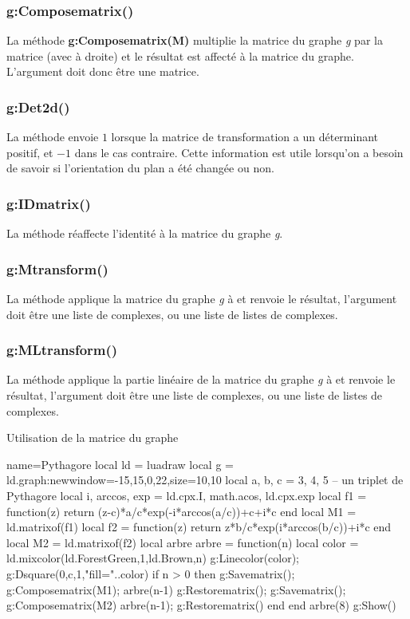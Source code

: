 \subsubsection{g:Composematrix()}
La méthode \textbf{g:Composematrix(M)} multiplie la matrice du graphe \emph{g} par la matrice  (avec  à droite) et le résultat est affecté à la matrice du graphe. L'argument  doit donc être une matrice.

\subsubsection{g:Det2d()}
La méthode  envoie $1$ lorsque la matrice de transformation a un déterminant positif, et $-1$ dans le cas contraire. Cette information est utile lorsqu'on a besoin de savoir si l'orientation du plan a été changée ou non.

\subsubsection{g:IDmatrix()}
La méthode  réaffecte l'identité à la matrice du graphe \emph g.

\subsubsection{g:Mtransform()}
La méthode  applique la matrice du graphe \emph g à  et renvoie le résultat, l'argument  doit être une liste de complexes, ou une liste de listes de complexes.

\subsubsection{g:MLtransform()}
La méthode  applique la partie linéaire de la matrice du graphe \emph g à  et renvoie le résultat, l'argument  doit être une liste de complexes, ou une liste de listes de complexes.

\begin{demo}{Utilisation de la matrice du graphe}
\begin{luadraw}{name=Pythagore}
local ld = luadraw
local g = ld.graph:new{window={-15,15,0,22},size={10,10}}
local a, b, c = 3, 4, 5 -- un triplet de Pythagore
local i, arccos, exp = ld.cpx.I, math.acos, ld.cpx.exp
local f1 = function(z)
    return (z-c)*a/c*exp(-i*arccos(a/c))+c+i*c end
local M1 = ld.matrixof(f1)
local f2 = function(z)
    return z*b/c*exp(i*arccos(b/c))+i*c end
local M2 = ld.matrixof(f2)
local arbre
arbre = function(n)
    local color = ld.mixcolor(ld.ForestGreen,1,ld.Brown,n)
    g:Linecolor(color); g:Dsquare(0,c,1,"fill="..color)
    if n > 0 then
        g:Savematrix(); g:Composematrix(M1); arbre(n-1)
        g:Restorematrix(); g:Savematrix(); g:Composematrix(M2)
        arbre(n-1); g:Restorematrix()
    end
end
arbre(8)
g:Show()
\end{luadraw}
\end{demo}


